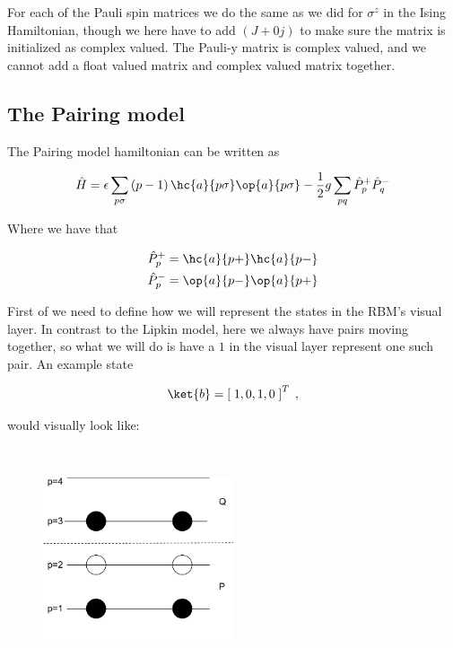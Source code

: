 For each of the Pauli spin matrices we do the same as we did for $\sigma^z$ in the Ising Hamiltonian, though we here have to add $(J+0j)$ to make sure the matrix is initialized as complex valued. The Pauli-y matrix is complex valued, and we cannot add a float valued matrix and complex valued matrix together.

\subsection{The Pairing model}

 The Pairing model hamiltonian can be written as

\begin{equation}
  \hat{H} = \epsilon \sum_{p\sigma} \left(p-1\right)\hc{a}{p\sigma}\op{a}{p\sigma} - \frac{1}{2}g\sum_{pq}\hat{P}_p^+\hat{P}_q^-
  \label{eq:Pairing_model_imp}
\end{equation}

Where we have that

\begin{equation*}
  \begin{gathered}
    \hat{P}_p^+ = \hc{a}{p+}\hc{a}{p-}\\
    \hat{P}_p^- = \op{a}{p-}\op{a}{p+}
  \end{gathered}
\end{equation*}

First of we need to define how we will represent the states in the RBM's visual layer. In contrast to the Lipkin model, here we always have pairs moving together, so what we will do is have a $1$ in the visual layer represent one such pair. An example state

$$\ket{b} = \left[\;1, 0, 1, 0 \; \right]^T \; ,$$

would visually look like:

\vspace{\baselineskip}
\\
\begin{figure}[H]
  \begin{center}
    \includegraphics[width=0.5\textwidth]{Figures/Drawn/Pairing/pairing_imp_exp.pdf}
  \end{center}
\end{figure}

